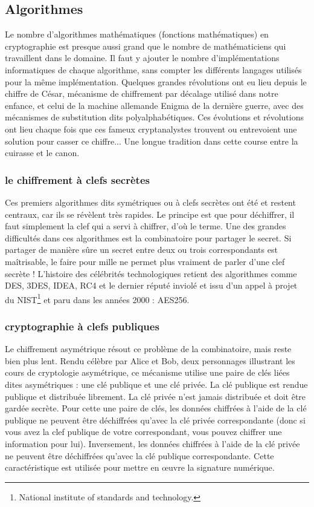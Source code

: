 \subsection{Algorithmes}

Le nombre d'algorithmes mathématiques
(fonctions mathématiques) en cryptographie est presque aussi grand que le nombre de mathématiciens qui travaillent dans le domaine. Il faut y ajouter le nombre d'implémentations informatiques de chaque algorithme, sans compter les différents langages utilisés pour la même implémentation.
Quelques grandes révolutions ont eu lieu depuis le chiffre de César, mécanisme de chiffrement par décalage
utilisé dans notre enfance, et celui de la machine allemande Enigma de la dernière guerre, avec des mécanismes de substitution dits polyalphabétiques. Ces évolutions et révolutions ont lieu chaque fois que ces fameux cryptanalystes trouvent ou entrevoient une solution pour casser ce chiffre... Une longue tradition dans cette course entre la cuirasse et le canon.


\subsubsection{le chiffrement à clefs secrètes} 
Ces premiers algorithmes dits symétriques ou à clefs secrètes ont été et restent centraux, car ils se révèlent très rapides. Le principe est que pour déchiffrer, il faut simplement la clef qui a servi à chiffrer, d'où le terme.
Une des grandes difficultés dans ces algorithmes est la combinatoire pour partager le secret. Si partager de manière sûre un secret entre deux ou trois correspondants est maîtrisable, le faire pour mille ne permet plus vraiment de parler d'une clef secrète ! L'histoire des célébrités technologiques retient des algorithmes comme DES, 3DES, IDEA, RC4 et le dernier réputé inviolé et issu d'un appel à projet du NIST\footnote{National institute of standards and technology.} et paru dans les années 2000 : AES256.

\subsubsection{cryptographie à clefs publiques}
Le chiffrement asymétrique résout ce problème de la combinatoire, mais reste bien plus lent. Rendu célèbre par Alice et Bob, deux personnages illustrant les cours de cryptologie asymétrique, ce mécanisme utilise une paire de clés liées dites asymétriques : une clé publique et une clé privée. La clé publique est rendue publique et distribuée librement. La clé privée n'est jamais distribuée et doit être gardée secrète. Pour cette une paire de clés, les données chiffrées à l'aide de la clé publique ne peuvent être déchiffrées qu'avec la clé privée correspondante (donc si vous avez la clef publique de votre correspondant, vous pouvez chiffrer une information pour lui). Inversement, les données chiffrées à l'aide de la clé privée ne peuvent être déchiffrées qu'avec la clé publique correspondante. Cette caractéristique est utilisée pour mettre en œuvre la signature numérique.


